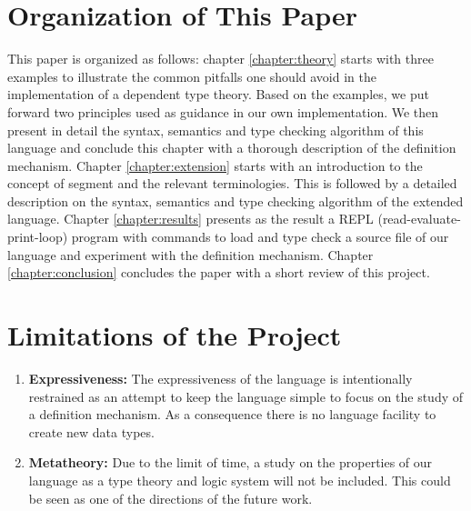 \section{Organization of This Paper}
This paper is organized as follows: chapter \ref{chapter:theory} starts with three examples to illustrate the common pitfalls one should avoid in the implementation of a dependent type theory. Based on the examples, we put forward two principles used as guidance in our own implementation. We then present in detail the syntax, semantics and type checking algorithm of this language and conclude this chapter with a thorough description of the definition mechanism. Chapter \ref{chapter:extension} starts with an introduction to the concept of segment and the relevant terminologies. This is followed by a detailed description on the syntax, semantics and type checking algorithm of the extended language. Chapter \ref{chapter:results} presents as the result a REPL (read-evaluate-print-loop) program with commands to load and type check a source file of our language and experiment with the definition mechanism. Chapter \ref{chapter:conclusion} concludes the paper with a short review of this project.

\section{Limitations of the Project}
\begin{enumerate}
\item \textbf{Expressiveness:} The expressiveness of the language is intentionally restrained as an attempt to keep the language simple to focus on the study of a definition mechanism. As a consequence there is no language facility to create new data types.
\item \textbf{Metatheory:} Due to the limit of time, a study on the properties of our language as a type theory and logic system will not be included. This could be seen as one of the directions of the future work.
\end{enumerate}
